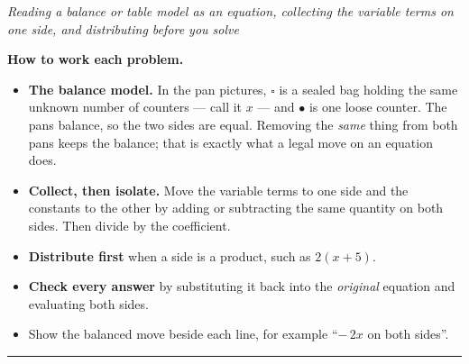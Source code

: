 \documentclass[12pt]{article}
\begin{document}

\begin{center}\small\textit{Reading a balance or table model as an equation,
collecting the variable terms on one side, and distributing before you solve}\end{center}

\noindent\textbf{How to work each problem.}
\begin{itemize}[leftmargin=0.9cm, itemsep=2pt, topsep=3pt]
  \item \textbf{The balance model.} In the pan pictures, $\square$ is a sealed bag
        holding the same unknown number of counters --- call it $x$ --- and
        $\bullet$ is one loose counter. The pans balance, so the two sides are
        equal. Removing the \emph{same} thing from both pans keeps the balance;
        that is exactly what a legal move on an equation does.
  \item \textbf{Collect, then isolate.} Move the variable terms to one side and
        the constants to the other by adding or subtracting the same quantity on
        both sides. Then divide by the coefficient.
  \item \textbf{Distribute first} when a side is a product, such as $2(x+5)$.
  \item \textbf{Check every answer} by substituting it back into the
        \emph{original} equation and evaluating both sides.
  \item Show the balanced move beside each line, for example
        ``$-\,2x$ on both sides''.
\end{itemize}
\vspace{0.15cm}
\noindent\rule{\linewidth}{0.4pt}

\end{document}
